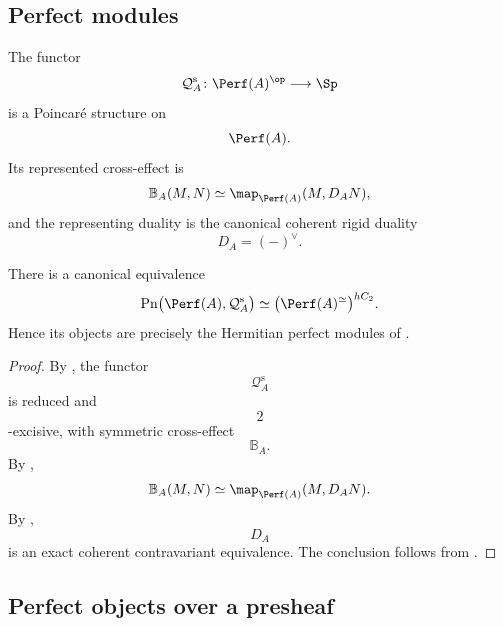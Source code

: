 \subsection{Perfect modules}

\begin{corollary}
\label{cor:canonical-poincare-perfect-modules}
The functor
\[
    \mathcal Q_A^{\mathrm s}
    \colon
    \Perf(A)^{\op}
    \longrightarrow
    \Sp
\]
is a Poincar\'e structure on
\[
    \Perf(A).
\]
Its represented cross-effect is
\[
    \mathbb B_A(M,N)
    \simeq
    \map_{\Perf(A)}(M,D_A N),
\]
and the representing duality is the canonical coherent rigid duality
\[
    D_A
    =
    (-)^\vee.
\]

There is a canonical equivalence
\[
    \operatorname{Pn}
    \bigl(
        \Perf(A),
        \mathcal Q_A^{\mathrm s}
    \bigr)
    \simeq
    \bigl(
        \Perf(A)^\simeq
    \bigr)^{hC_2}.
\]
Hence its objects are precisely the Hermitian perfect modules of
.
\end{corollary}

\begin{proof}
By
,
the functor
\[
    \mathcal Q_A^{\mathrm s}
\]
is reduced and
\[
    2
\]
-excisive, with symmetric cross-effect
\[
    \mathbb B_A.
\]
By
,
\[
    \mathbb B_A(M,N)
    \simeq
    \map_{\Perf(A)}(M,D_A N).
\]
By
,
\[
    D_A
\]
is an exact coherent contravariant equivalence. The conclusion follows
from
.
\end{proof}


\subsection{Perfect objects over a presheaf}

